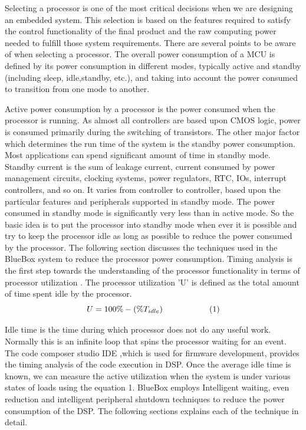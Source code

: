 Selecting a processor is one of the most critical decisions when we are designing an embedded 
system. This selection is based on the features required to satisfy the control functionality of the final product and the raw computing power needed to fulfill those system requirements. There are several points to be aware of when selecting a processor. The overall power consumption of a MCU is defined by its power consumption in different modes, typically active and standby (including sleep, idle,standby, etc.),  and taking into account the power consumed to transition from one mode to another. 

Active power consumption by a processor is the power consumed when the processor is running. As almost all controllers are based upon CMOS logic, power is consumed primarily during the switching of transistors. The other major factor which determines the run time of the system is the standby power consumption. Most applications can spend significant amount of time in standby mode. Standby current is the sum of leakage current, current consumed by power management circuits, clocking systems, power regulators, RTC, IOs, interrupt controllers, and so on. It varies from controller to controller, based upon the particular features and peripherals supported in standby mode.  
The power consumed in standby mode is significantly very less than in active mode. So the basic idea is to put the processor into standby mode when ever it is possible and try to keep the processor idle as long as possible to reduce the power consumed by the processor. The following section discusses the techniques used in the BlueBox system to reduce the processor power consumption. 
Timing analysis is the first step towards the understanding of the processor functionality in terms of processor utilization \cite{sastra}. The processor utilization 'U' is defined as the total amount of time spent idle by the processor. 
\[ U = 100\% - (\% T_{idle}) \hspace{20mm} (1)\]

Idle time is the time during which processor does not do any useful work. Normally this is an infinite loop that spins the processor waiting for an event. The code composer studio IDE ,which is used for firmware development,  provides the timing analysis of the code execution in DSP. Once the average idle time is known, we can measure the active utilization when the system is under various states of loads using the equation 1. BlueBox employs Intelligent waiting, even reduction and intelligent peripheral shutdown techniques to reduce the power consumption of the DSP. The following sections explains each of the technique in detail. 

